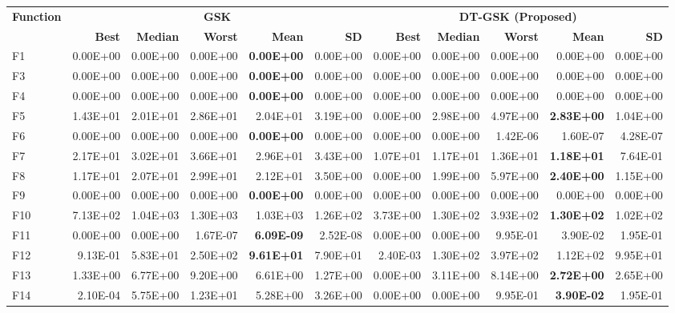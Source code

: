 \zebra
\begin{tabular}{lrrrrrrrrrr}
\toprule
\textbf{Function} & \multicolumn{5}{c}{\textbf{GSK}} & \multicolumn{5}{c}{\textbf{DT-GSK (Proposed)}} \\
\cmidrule(lr){2-6} \cmidrule(lr){7-11}
 & \textbf{Best} & \textbf{Median} & \textbf{Worst} & \textbf{Mean} & \textbf{SD} & \textbf{Best} & \textbf{Median} & \textbf{Worst} & \textbf{Mean} & \textbf{SD} \\
\midrule
F1 & 0.00E+00 & 0.00E+00 & 0.00E+00 & \textbf{0.00E+00} & 0.00E+00 & 0.00E+00 & 0.00E+00 & 0.00E+00 & 0.00E+00 & 0.00E+00 \\
F3 & 0.00E+00 & 0.00E+00 & 0.00E+00 & \textbf{0.00E+00} & 0.00E+00 & 0.00E+00 & 0.00E+00 & 0.00E+00 & 0.00E+00 & 0.00E+00 \\
F4 & 0.00E+00 & 0.00E+00 & 0.00E+00 & \textbf{0.00E+00} & 0.00E+00 & 0.00E+00 & 0.00E+00 & 0.00E+00 & 0.00E+00 & 0.00E+00 \\
F5 & 1.43E+01 & 2.01E+01 & 2.86E+01 & 2.04E+01 & 3.19E+00 & 0.00E+00 & 2.98E+00 & 4.97E+00 & \textbf{2.83E+00} & 1.04E+00 \\
F6 & 0.00E+00 & 0.00E+00 & 0.00E+00 & \textbf{0.00E+00} & 0.00E+00 & 0.00E+00 & 0.00E+00 & 1.42E-06 & 1.60E-07 & 4.28E-07 \\
F7 & 2.17E+01 & 3.02E+01 & 3.66E+01 & 2.96E+01 & 3.43E+00 & 1.07E+01 & 1.17E+01 & 1.36E+01 & \textbf{1.18E+01} & 7.64E-01 \\
F8 & 1.17E+01 & 2.07E+01 & 2.99E+01 & 2.12E+01 & 3.50E+00 & 0.00E+00 & 1.99E+00 & 5.97E+00 & \textbf{2.40E+00} & 1.15E+00 \\
F9 & 0.00E+00 & 0.00E+00 & 0.00E+00 & \textbf{0.00E+00} & 0.00E+00 & 0.00E+00 & 0.00E+00 & 0.00E+00 & 0.00E+00 & 0.00E+00 \\
F10 & 7.13E+02 & 1.04E+03 & 1.30E+03 & 1.03E+03 & 1.26E+02 & 3.73E+00 & 1.30E+02 & 3.93E+02 & \textbf{1.30E+02} & 1.02E+02 \\
F11 & 0.00E+00 & 0.00E+00 & 1.67E-07 & \textbf{6.09E-09} & 2.52E-08 & 0.00E+00 & 0.00E+00 & 9.95E-01 & 3.90E-02 & 1.95E-01 \\
F12 & 9.13E-01 & 5.83E+01 & 2.50E+02 & \textbf{9.61E+01} & 7.90E+01 & 2.40E-03 & 1.30E+02 & 3.97E+02 & 1.12E+02 & 9.95E+01 \\
F13 & 1.33E+00 & 6.77E+00 & 9.20E+00 & 6.61E+00 & 1.27E+00 & 0.00E+00 & 3.11E+00 & 8.14E+00 & \textbf{2.72E+00} & 2.65E+00 \\
F14 & 2.10E-04 & 5.75E+00 & 1.23E+01 & 5.28E+00 & 3.26E+00 & 0.00E+00 & 0.00E+00 & 9.95E-01 & \textbf{3.90E-02} & 1.95E-01 \\

\end{tabular}
